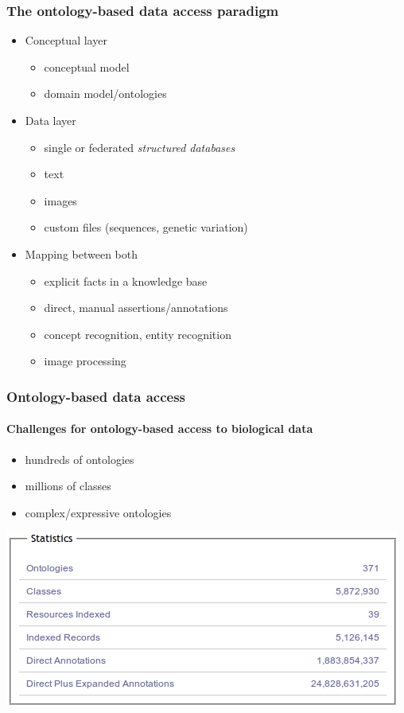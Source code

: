 \documentclass{beamer}
\renewcommand{\em}{\itshape}
\begin{document}
\begin{frame}
  \frametitle{The ontology-based data access paradigm}
  \begin{itemize}
  \item<1,2> Conceptual layer
    \begin{itemize}
    \item conceptual model
    \item domain model/ontologies
    \end{itemize}
  \item<1> Data layer
    \begin{itemize}
    \item single or federated {\em structured databases}
    \item text
    \item images
    \item custom files (sequences, genetic variation)
    \end{itemize}
  \item<1> Mapping between both
    \begin{itemize}
    \item explicit facts in a knowledge base
    \item direct, manual assertions/annotations
    \item concept recognition, entity recognition
    \item image processing
    \end{itemize}
  \end{itemize}
\end{frame}

\begin{frame}
  \frametitle{Ontology-based data access}
  \framesubtitle{Challenges for ontology-based access to biological data}
  \begin{itemize}
  \item hundreds of ontologies
  \item millions of classes
  \item complex/expressive ontologies
  \end{itemize}
  \centerline{\includegraphics[width=.6\textwidth]{bioportal-statistics.png}}
\end{frame}
\end{document}
